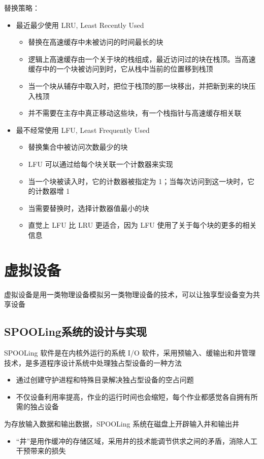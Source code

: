 \documentclass[cs4size,a4paper,10pt]{ctexart}
\begin{document}
		替换策略：
		\begin{itemize}
			\item 最近最少使用 LRU, Least Recently Used
			\begin{itemize}
				\item 替换在高速缓存中未被访问的时间最长的块
				\item 逻辑上高速缓存由一个关于块的栈组成，最近访问过的块在栈顶。当高速缓存中的一个块被访问到时，它从栈中当前的位置移到栈顶
				\item 当一个块从辅存中取入时，把位于栈顶的那一块移出，并把新到来的块压入栈顶
				\item 并不需要在主存中真正移动这些块，有一个栈指针与高速缓存相关联
			\end{itemize}
			\item 最不经常使用 LFU, Least Frequently Used
			\begin{itemize}
				\item 替换集合中被访问次数最少的块
				\item LFU 可以通过给每个块关联一个计数器来实现
				\item 当一个块被读入时，它的计数器被指定为 1；当每次访问到这一块时，它的计数器增 1
				\item 当需要替换时，选择计数器值最小的块
				\item 直觉上 LFU 比 LRU 更适合，因为 LFU 使用了关于每个块的更多的相关信息
			\end{itemize}
		\end{itemize}

		\section{虚拟设备}
		虚拟设备是用一类物理设备模拟另一类物理设备的技术，可以让独享型设备变为共享设备

		\subsection{SPOOLing系统的设计与实现}
		SPOOLing 软件是在内核外运行的系统 I/O 软件，采用预输入、缓输出和井管理技术，是多道程序设计系统中处理独占型设备的一种方法
		\begin{itemize}
			\item 通过创建守护进程和特殊目录解决独占型设备的空占问题
			\item 不仅设备利用率提高，作业的运行时间也会缩短，每个作业都感觉各自拥有所需的独占设备
		\end{itemize}

		为存放输入数据和输出数据，SPOOLing 系统在磁盘上开辟输入井和输出井
		\begin{itemize}
			\item “井”是用作缓冲的存储区域，采用井的技术能调节供求之间的矛盾，消除人工干预带来的损失
		\end{itemize}
\end{document}
